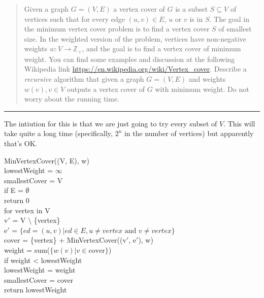 \documentclass[11pt]{article}
\begin{document}



\begin{quote}
    Given a graph $G=(V,E)$ a vertex cover of $G$ is a subset
  $S \subseteq V$ of vertices such that for every edge $(u,v) \in E$,
  $u$ or $v$ is in $S$. The goal in the minimum vertex cover problem
  is to find a vertex cover $S$ of smallest size. In the weighted
  version of the problem, vertices have non-negative weights
  $w: V \rightarrow \mathbb{Z}_+$, and the goal is to find a vertex
  cover of minimum weight.  You can find some examples and discussion
  at the following Wikipedia link
  \url{https://en.wikipedia.org/wiki/Vertex_cover}.  Describe a {\em
    recursive} algorithm that given a graph $G=(V,E)$ and weights
  $w(v), v \in V$ outputs a vertex cover of $G$ with minimum
  weight. Do not worry about the running time.

\end{quote}
\hrule



\begin{solution}
    The intiution for this is that we are just going to try every subset of $V$. This will take quite a long time (specifically, $2^n$ in the number of vertices) but apparently that's OK.
    \begin{algo}
        MinVertexCover((V, E), w) \+
        \\ lowestWeight = $\infty$
        \\ smallestCover = V
        \\ if E = $\emptyset$ \+
        \\      return 0 \-
        \\ for vertex in V \+
        \\      v$'$ = V $\setminus$ \{vertex\}
        \\      e$'$ = $\{ ed = (u,v) | ed \in E, u \neq vertex \text{ and } v \neq vertex\}$
        \\      cover = \{vertex\} + MinVertexCover((v$'$, e$'$), w)
        \\      weight = sum($\{ w(v) | v \in \text{cover}\}$)
        \\          if weight < lowestWeight \+
        \\               lowestWeight = weight 
        \\               smallestCover = cover \- \-
        \\ return lowestWeight
    \end{algo}
\end{solution}
\end{document}

